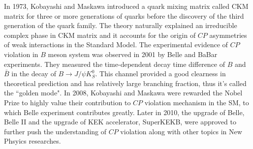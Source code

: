 In 1973, Kobayashi and Maskawa introduced a quark mixing matrix called CKM matrix for three or more generations of quarks before the discovery of the third generation of the quark family\cite{CKM}. The theory naturally explained an irreducible complex phase in CKM matrix and it accounts for the origin of $CP$ asymmetries of weak interactions in the Standard Model. The experimental evidence of $CP$ violation in $B$ meson system was observed in 2001 by Belle and BaBar experiments\cite{teramoto2002cp}\cite{langestudy}. They measured the time-dependent decay time difference of $B$ and $\bar{B}$ in the decay of $B\to J/\psi K_S^0$. This channel provided a good clearness in theoretical prediction and has relatively large branching fraction, thus it's called the ``golden mode"\cite{bigi1989question}. In 2008, Kobayashi and Maskawa were rewarded the Nobel Prize to highly value their contribution to $CP$ violation mechanism in the SM, to which Belle experiment contributes greatly. Later in 2010, the upgrade of Belle, Belle II and the upgrade of KEK accelerator, SuperKEKB, were approved to further push the understanding of $CP$ violation along with other topics in New Phsyics researches. 

